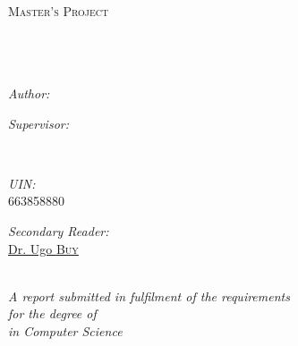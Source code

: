\documentclass[11pt, a4paper, oneside]{Thesis} %
\begin{document}
\begin{titlepage}
\begin{center}

\textsc{\LARGE \univname}\\[1.5cm] %
\textsc{\Large Master's Project}\\[0.5cm] %

\HRule \\[0.4cm] %
{\huge \bfseries \ttitle}\\[0.4cm] %
\HRule \\[1.5cm] %
 
\begin{minipage}{0.4\textwidth}
\begin{flushleft} \large
\emph{Author:}\\
\href{https://www.linkedin.com/in/kushshah}{\authornames} %
\end{flushleft}
\end{minipage}
\begin{minipage}{0.4\textwidth}
\begin{flushright} \large
\emph{Supervisor:} \\
\href{http://www.cs.uic.edu/~drmark/}{\supname} %
\end{flushright}
\end{minipage}\\[0.4cm]
\begin{minipage}{0.4\textwidth}
\begin{flushleft} \large
\emph{UIN:}\\
663858880
\end{flushleft}
\end{minipage}
\begin{minipage}{0.4\textwidth}
\begin{flushright} \large
\emph{Secondary Reader:} \\
\href{http://www.cs.uic.edu/~buy/ugo_buy_details.html}{Dr. Ugo  \textsc{Buy}} %
\end{flushright}
\end{minipage}\\[3cm]
 
\large \textit{A report submitted in fulfilment of the requirements\\ for the degree of \degreename}\\[0.3cm] %
\textit{in Computer Science}\\[2cm]
\deptname\\[0.4cm] %


\end{center}
\end{titlepage}
\end{document}
